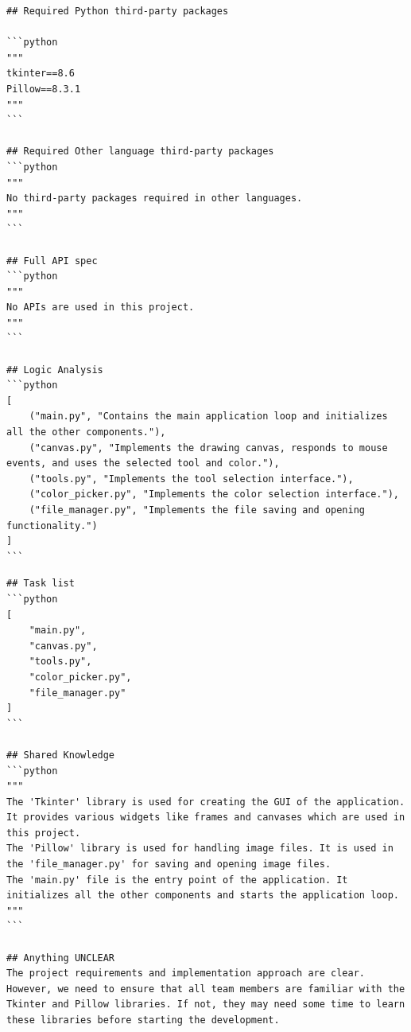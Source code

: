 

\begin{tcolorbox}[title={\textbf{\small Tasks}}, colback=whitesmoke, colframe=royalblue(web), boxrule=2pt, arc=0mm]
{\scriptsize
\begin{lstlisting}[style=mystyle]
## Required Python third-party packages

```python
"""
tkinter==8.6
Pillow==8.3.1
"""
```

## Required Other language third-party packages
```python
"""
No third-party packages required in other languages.
"""
```

## Full API spec
```python
"""
No APIs are used in this project.
"""
```

## Logic Analysis
```python
[
    ("main.py", "Contains the main application loop and initializes all the other components."),
    ("canvas.py", "Implements the drawing canvas, responds to mouse events, and uses the selected tool and color."),
    ("tools.py", "Implements the tool selection interface."),
    ("color_picker.py", "Implements the color selection interface."),
    ("file_manager.py", "Implements the file saving and opening functionality.")
]
```
\end{lstlisting}
}
\end{tcolorbox}

\begin{tcolorbox}[title={\textbf{\small Product Requirement Document}}, colback=whitesmoke, colframe=royalblue(web), boxrule=2pt, arc=0mm]
{\scriptsize
\begin{lstlisting}[style=mystyle]
## Task list
```python
[
    "main.py",
    "canvas.py",
    "tools.py",
    "color_picker.py",
    "file_manager.py"
]
```

## Shared Knowledge
```python
"""
The 'Tkinter' library is used for creating the GUI of the application. It provides various widgets like frames and canvases which are used in this project.
The 'Pillow' library is used for handling image files. It is used in the 'file_manager.py' for saving and opening image files.
The 'main.py' file is the entry point of the application. It initializes all the other components and starts the application loop.
"""
```

## Anything UNCLEAR
The project requirements and implementation approach are clear. However, we need to ensure that all team members are familiar with the Tkinter and Pillow libraries. If not, they may need some time to learn these libraries before starting the development.
\end{lstlisting}
}
\end{tcolorbox}

